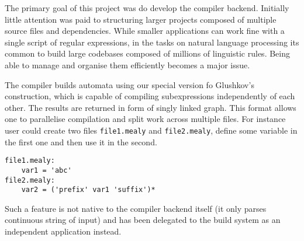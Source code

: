 The primary goal of this project was do develop the compiler backend. 
Initially little attention was paid to structuring larger projects composed of multiple source files and dependencies. While smaller applications can work fine with a single script of regular expressions, in the tasks on natural language processing its common to build large codebases composed of millions of linguistic rules. Being able to manage and organise them efficiently becomes a major issue. 

The compiler builds automata using our special version fo Glushkov's construction, which is capable of compiling subexpressions independently of each other. The results are returned in form of singly linked graph. This format allows one to parallelise compilation and split work across multiple files. For instance user could create two files \texttt{file1.mealy} and \texttt{file2.mealy}, define some variable in the first one and then use it in the second.
\begin{lstlisting}
file1.mealy:
    var1 = 'abc'
file2.mealy:
    var2 = ('prefix' var1 'suffix')*
\end{lstlisting}
Such a feature is not native to the compiler backend itself (it only parses continuous string of input) and has been delegated to the build system as an independent application instead. 

